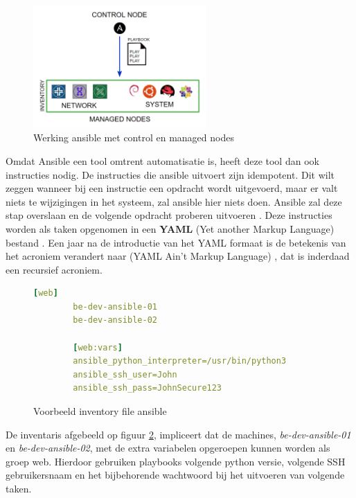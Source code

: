 \begin{figure}[htbp]
\centerline{\includegraphics[width=250]{bachproef/img/AnsibleArchitecture.png}}
\caption{Werking ansible met control en managed nodes \autocite{Coding2019}}
\label{fig}
\end{figure}
\newpage
Omdat Ansible een tool omtrent automatisatie is, heeft deze tool dan ook instructies nodig. De instructies die ansible uitvoert zijn idempotent. Dit wilt zeggen wanneer bij een instructie een opdracht wordt uitgevoerd, maar er valt niets te wijzigingen in het systeem, zal ansible hier niets doen. Ansible zal deze stap overslaan en de volgende opdracht proberen uitvoeren \autocite{Coding2019}. Deze instructies worden als taken opgenomen in een \textbf{YAML} (Yet another Markup Language) bestand \autocite{ingerson80yet}. Een jaar na de introductie van het YAML formaat is de betekenis van het acroniem verandert naar (YAML Ain't Markup Language) \autocite{VugtYAML}, dat is inderdaad een recursief acroniem. %


\begin{figure}[hbtp]
    \caption{Voorbeeld inventory file ansible}
    \begin{lstlisting}[language=yaml,frame=single]
        [web]
        be-dev-ansible-01
        be-dev-ansible-02
        
        [web:vars]
        ansible_python_interpreter=/usr/bin/python3
        ansible_ssh_user=John 
        ansible_ssh_pass=JohnSecure123
    \end{lstlisting}
    \label{fig:inventorypass}
\end{figure}
De inventaris afgebeeld op figuur \ref{fig:inventorypass}, impliceert dat de machines, \textit{be-dev-ansible-01} en \textit{be-dev-ansible-02}, met de extra variabelen opgeroepen kunnen worden als groep web. Hierdoor gebruiken playbooks volgende python versie, volgende SSH gebruikersnaam en het bijbehorende wachtwoord bij het uitvoeren van volgende taken.


